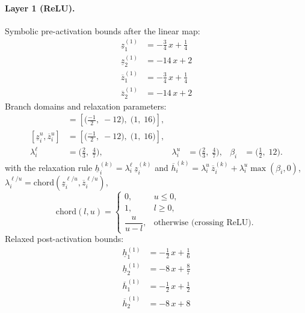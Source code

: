 \documentclass[11pt]{article}
\begin{document}
\paragraph{Layer 1 (ReLU).}
Symbolic pre-activation bounds after the linear map:
\begin{align*}
\underline{z}^{(1)}_{1} &= -\frac{3}{4}\,x + \frac{1}{4} \\
\underline{z}^{(1)}_{2} &= -14\,x + 2
\end{align*}
\begin{align*}
\overline{z}^{(1)}_{1} &= -\frac{3}{4}\,x + \frac{1}{4} \\
\overline{z}^{(1)}_{2} &= -14\,x + 2
\end{align*}
Branch domains and relaxation parameters:
\begin{align*}
[\underline{z}^{\ell}_i, \overline{z}^{\ell}_i] &= [\bigl(\frac{-1}{2},\; -12\bigr),\; \bigl(1,\; 16\bigr)], \\ 
[\underline{z}^{u}_i, \overline{z}^{u}_i] &= [\bigl(\frac{-1}{2},\; -12\bigr),\; \bigl(1,\; 16\bigr)], \\
\lambda^{\ell}_i &= \bigl(\frac{2}{3},\; \frac{4}{7}\bigr), & \lambda^{u}_i &= \bigl(\frac{2}{3},\; \frac{4}{7}\bigr), & \beta_i &= \bigl(\frac{1}{2},\; 12\bigr).
\end{align*}
with the relaxation rule
$\underline{h}^{(k)}_i = \lambda^{\ell}_i\, \underline{z}^{(k)}_i$ and
$\overline{h}^{(k)}_i = \lambda^{u}_i\, \overline{z}^{(k)}_i + \lambda^{u}_i \max(\beta_i, 0)$,
$\lambda^{\ell/u}_i = \mathrm{chord}(\underline{z}_i^{\ell/u}, \overline{z}_i^{\ell/u})$,
\[
\mathrm{chord}(l, u) =
\begin{cases}
0, & u \le 0,\\
1, & l \ge 0,\\
\dfrac{u}{u - l}, & \text{otherwise (crossing ReLU)}.
\end{cases}\]
Relaxed post-activation bounds:
\begin{align*}
\underline{h}^{(1)}_{1} &= -\frac{1}{2}\,x + \frac{1}{6} \\
\underline{h}^{(1)}_{2} &= -8\,x + \frac{8}{7}
\end{align*}
\begin{align*}
\overline{h}^{(1)}_{1} &= -\frac{1}{2}\,x + \frac{1}{2} \\
\overline{h}^{(1)}_{2} &= -8\,x + 8
\end{align*}
\end{document}
